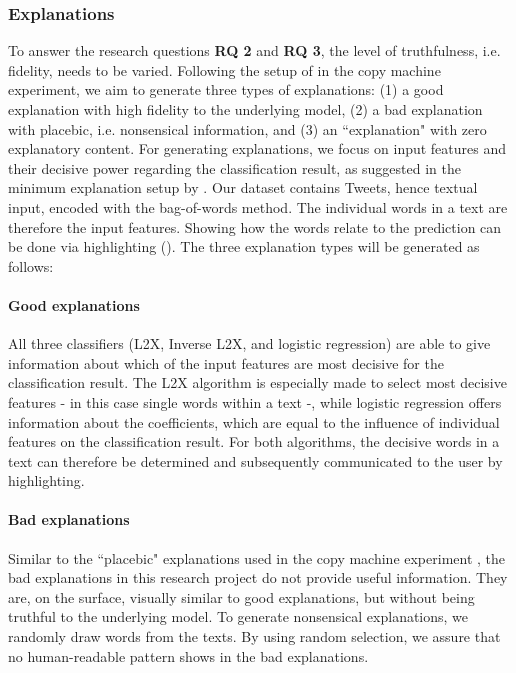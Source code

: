 \subsubsection{Explanations}
To answer the research questions \textbf{RQ 2} and \textbf{RQ 3}, the level of truthfulness, i.e. fidelity, needs to be varied. Following the setup of \cite{langer1978mindlessness} in the copy machine experiment, we aim to generate three types of explanations: (1) a good explanation with high fidelity to the underlying model, (2) a bad explanation with placebic, i.e. nonsensical information, and (3) an ``explanation" with zero explanatory content.\newline
For generating explanations, we focus on input features and their decisive power regarding the classification result, as suggested in the minimum explanation setup by \cite{goodman16eu}. Our dataset contains Tweets, hence textual input, encoded with the bag-of-words method. The individual words in a text are therefore the input features. Showing how the words relate to the prediction can be done via highlighting (\cite{arras2017relevant, chen2012detecting, feng2018pathologies}).\newline
The three explanation types will be generated as follows:
\paragraph{Good explanations}
All three classifiers (L2X, Inverse L2X, and logistic regression) are able to give information about which of the input features are most decisive for the classification result. The L2X algorithm is especially made to select most decisive features - in this case single words within a text -, while logistic regression offers information about the coefficients, which are equal to the influence of individual features on the classification result. For both algorithms, the decisive words in a text can therefore be determined and subsequently communicated to the user by highlighting.
\paragraph{Bad explanations}
Similar to the ``placebic" explanations used in the copy machine experiment \cite{langer1978mindlessness}, the bad explanations in this research project do not provide useful information. They are, on the surface, visually similar to good explanations, but without being truthful to the underlying model. To generate nonsensical explanations, we randomly draw words from the texts. By using random selection, we assure that no human-readable pattern shows in the bad explanations.
